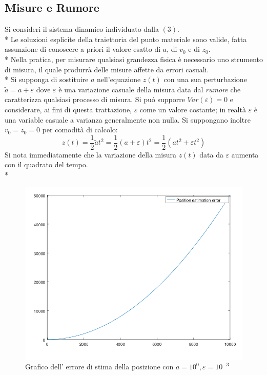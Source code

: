 \subsection{Misure e Rumore}
Si consideri il sistema dinamico individuato dalla $(3)$.\\*
Le soluzioni esplicite della traiettoria del punto materiale sono valide, fatta assunzione di conoscere a priori il valore esatto di $a$, di $v_0$ e di $z_0$.\\*
Nella pratica, per misurare qualsiasi grandezza fisica \`e necessario uno strumento di misura, il quale produrr\`a delle misure affette da errori casuali.\\*
Si supponga di sostituire $a$ nell'equazione $z(t)$ con una sua perturbazione $\tilde{a} = a + \varepsilon$ dove $\varepsilon$ \`e una variazione casuale della misura data dal \emph{rumore} che caratterizza qualsiasi processo di misura. Si pu\'o supporre $Var(\varepsilon) = 0$ e considerare, ai fini di questa trattazione, $\varepsilon$ come un valore costante; in realt\`a $\varepsilon$ \`e una variable casuale a varianza generalmente non nulla. Si suppongano inoltre $v_0 = z_0 = 0$ per comodit\`a di calcolo:
$$
z(t) = \frac{1}{2} \tilde{a} t^2 = \frac{1}{2}(a + \varepsilon) t^2 = \frac{1}{2} \left(at^2 + \varepsilon t^2\right)
$$
Si nota immediatamente che la variazione della misura $z(t)$ data da $\varepsilon$ aumenta con il quadrato del tempo.\\*
\begin{figure}[h]
	\centering
	\includegraphics[scale=0.5]{img/errormeas}
	\caption{Grafico dell' errore di stima della posizione con $a = 10^0, \varepsilon = 10^{-3}$}
	\label{fig:errormeas}
\end{figure}\newpage
